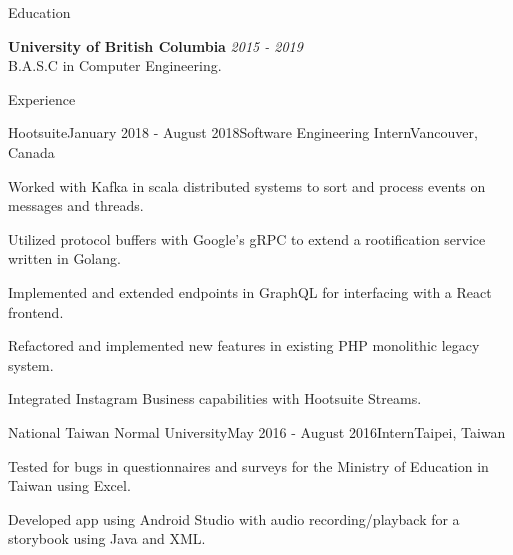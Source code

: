 \documentclass{resume} %
\begin{document}

\begin{rSection}{Education}

{\bf University of British Columbia} \hfill {\em 2015 - 2019} \\ 
B.A.S.C in Computer Engineering.

\end{rSection}
\begin{rSection}{Experience}

\begin{rSubsection}{Hootsuite}{January 2018 - August 2018}{Software Engineering Intern}{Vancouver, Canada}
\item Worked with Kafka in scala distributed systems to sort and process events on messages and threads.
\item Utilized protocol buffers with Google's gRPC to extend a rootification service written in Golang.
\item Implemented and extended endpoints in GraphQL for interfacing with a React frontend.
\item Refactored and implemented new features in existing PHP monolithic legacy system.
\item Integrated Instagram Business capabilities with Hootsuite Streams.  
\end{rSubsection}
\begin{rSubsection}{National Taiwan Normal University}{May 2016 - August 2016}{Intern}{Taipei, Taiwan}
\item Tested for bugs in questionnaires and surveys for the Ministry of Education in Taiwan using Excel.
\item Developed app using Android Studio with audio recording/playback for a storybook using Java and XML.
\end{rSubsection}

\end{rSection}


\end{document}
